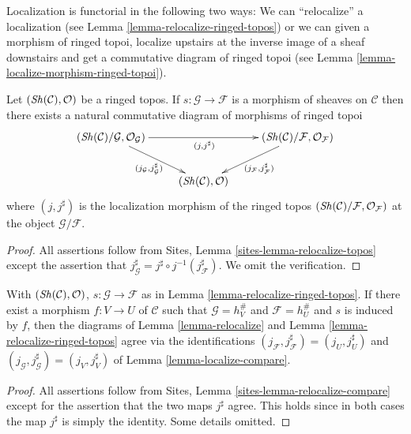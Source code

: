 \noindent
Localization is functorial in the following two ways:
We can ``relocalize'' a localization (see
Lemma \ref{lemma-relocalize-ringed-topos})
or we can given a morphism of ringed topoi, localize upstairs at
the inverse image of a sheaf downstairs and get a commutative
diagram of ringed topoi (see
Lemma \ref{lemma-localize-morphism-ringed-topoi}).

\begin{lemma}
\label{lemma-relocalize-ringed-topos}
Let $(\mathop{\mathit{Sh}}\nolimits(\mathcal{C}), \mathcal{O})$ be a ringed topos.
If $s : \mathcal{G} \to \mathcal{F}$ is a morphism of sheaves
on $\mathcal{C}$ then there exists a natural commutative diagram of
morphisms of ringed topoi
$$
\xymatrix{
(\Sh(\mathcal{C})/\mathcal{G}, \mathcal{O}_\mathcal{G})
\ar[rd]_{(j_\mathcal{G}, j_\mathcal{G}^\sharp)} \ar[rr]_{(j, j^\sharp)} & &
(\Sh(\mathcal{C})/\mathcal{F}, \mathcal{O}_\mathcal{F})
\ar[ld]^{(j_\mathcal{F}, j_\mathcal{F}^\sharp)} \\
& (\Sh(\mathcal{C}), \mathcal{O}) &
}
$$
where $(j, j^\sharp)$ is the localization morphism of the ringed topos
$(\mathop{\mathit{Sh}}\nolimits(\mathcal{C})/\mathcal{F}, \mathcal{O}_\mathcal{F})$
at the object $\mathcal{G}/\mathcal{F}$.
\end{lemma}

\begin{proof}
All assertions follow from
Sites, Lemma \ref{sites-lemma-relocalize-topos}
except the assertion that
$j_\mathcal{G}^\sharp = j^\sharp \circ j^{-1}(j_\mathcal{F}^\sharp)$.
We omit the verification.
\end{proof}

\begin{lemma}
\label{lemma-relocalize-compare}
With $(\mathop{\mathit{Sh}}\nolimits(\mathcal{C}), \mathcal{O})$,
$s : \mathcal{G} \to \mathcal{F}$ as in
Lemma \ref{lemma-relocalize-ringed-topos}.
If there exist a morphism $f : V \to U$ of $\mathcal{C}$
such that $\mathcal{G} = h_V^\#$ and $\mathcal{F} = h_U^\#$
and $s$ is induced by $f$, then the
diagrams of
Lemma \ref{lemma-relocalize}
and
Lemma \ref{lemma-relocalize-ringed-topos}
agree via the identifications
$(j_\mathcal{F}, j_\mathcal{F}^\sharp) = (j_U, j_U^\sharp)$
and
$(j_\mathcal{G}, j_\mathcal{G}^\sharp) = (j_V, j_V^\sharp)$
of
Lemma \ref{lemma-localize-compare}.
\end{lemma}

\begin{proof}
All assertions follow from
Sites, Lemma \ref{sites-lemma-relocalize-compare}
except for the assertion that the two maps $j^\sharp$
agree. This holds since in both cases the map
$j^\sharp$ is simply the identity. Some details omitted.
\end{proof}











